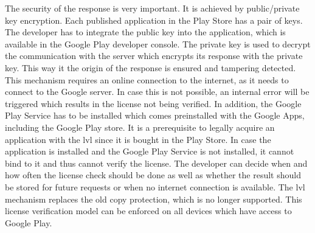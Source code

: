 \newline
The security of the response is very important.
It is achieved by public/private key encryption.
Each published application in the Play Store has a pair of keys.
The developer has to integrate the public key into the application, which is available in the Google Play developer console.
The private key is used to decrypt the communication with the server which encrypts its response with the private key.
This way it the origin of the response is ensured and tampering detected.
\cite{munteanLicense} \cite{developersLicensingOverview}
\newline
This mechanism requires an online connection to the internet, as it needs to connect to the Google server.
In case this is not possible, an internal error will be triggered which results in the license not being verified.
In addition, the Google Play Service has to be installed which comes preinstalled with the Google Apps, including the Google Play store.
It is a prerequisite to legally acquire an application with the \gls{lvl} since it is bought in the Play Store.
In case the application is installed and the Google Play Service is not installed, it cannot bind to it and thus cannot verify the license.
The developer can decide when and how often the license check should be done as well as whether the result should be stored for future requests or when no internet connection is available. \cite{developersLicensingAdding } \cite{developersLicensingOverview}
\newline
The \gls{lvl} mechanism replaces the old copy protection, which is no longer supported.
This license verification model can be enforced on all devices which have access to Google Play. \cite{developersLicensingAdding} \cite{developersLicensingOverview}
